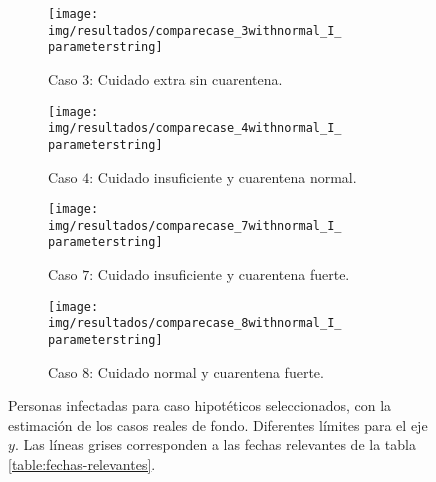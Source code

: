 \begin{figure}
     \centering
     \begin{subfigure}[b]{.47\textwidth}
         \centering
         \texttt{[image: img/resultados/comparecase\_3withnormal\_I\_\\parameterstring]}
         \caption{Caso \(3\): Cuidado extra sin cuarentena.}
     \end{subfigure}
     \hfill
     \begin{subfigure}[b]{.47\textwidth}
         \centering
         \texttt{[image: img/resultados/comparecase\_4withnormal\_I\_\\parameterstring]}
         \caption{Caso \(4\): Cuidado insuficiente y cuarentena normal.}
     \end{subfigure}
     \hfill
     \begin{subfigure}[b]{.47\textwidth}
         \centering
         \texttt{[image: img/resultados/comparecase\_7withnormal\_I\_\\parameterstring]}
         \caption{Caso \(7\): Cuidado insuficiente y cuarentena fuerte.}
     \end{subfigure}
     \hfill
     \begin{subfigure}[b]{.47\textwidth}
         \centering
         \texttt{[image: img/resultados/comparecase\_8withnormal\_I\_\\parameterstring]}
         \caption{Caso \(8\): Cuidado normal y cuarentena fuerte.}
     \end{subfigure}
        \caption[Personas infectadas para caso hipotéticos seleccionados.]{Personas infectadas para caso hipotéticos seleccionados, con la estimación de los casos reales de fondo. Diferentes límites para el eje \(y\). Las líneas grises corresponden a las fechas relevantes de la tabla \ref{table:fechas-relevantes}.}
        \label{img:hip-3478-I-comp}
\end{figure}

